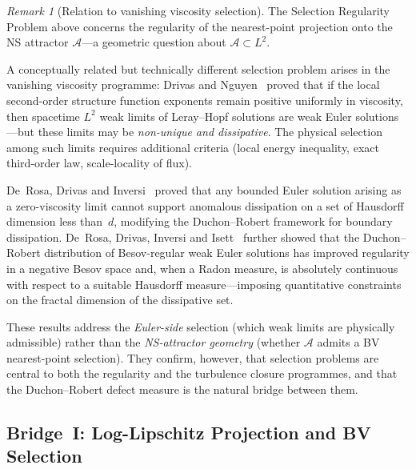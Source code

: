 \documentclass[12pt,a4paper]{article}
\theoremstyle{definition}
\theoremstyle{plain}
\theoremstyle{remark}
\newtheorem{remark}[definition]{Remark}
\begin{document}
\begin{remark}[Relation to vanishing viscosity selection]
\label{rem:Drivas-VV-selection}
The Selection Regularity Problem above concerns the regularity of the
nearest-point projection onto the NS attractor $\mathcal{A}$---a geometric
question about $\mathcal{A} \subset L^2$.

A conceptually related but technically different selection problem arises
in the vanishing viscosity programme: Drivas and
Nguyen~\cite{DrivasNguyen2019} proved that if the local second-order
structure function exponents remain positive uniformly in viscosity, then
spacetime $L^2$ weak limits of Leray--Hopf solutions are weak Euler
solutions---but these limits may be \emph{non-unique and dissipative}.
The physical selection among such limits requires additional criteria
(local energy inequality, exact third-order law, scale-locality of flux).

De~Rosa, Drivas and Inversi~\cite{DeRosaDrivasInversi2024} proved that any
bounded Euler solution arising as a zero-viscosity limit cannot support
anomalous dissipation on a set of Hausdorff dimension less than~$d$,
modifying the Duchon--Robert framework for boundary dissipation.
De~Rosa, Drivas, Inversi and Isett~\cite{DeRosaDrivasInversiIsett2025}
further showed that the Duchon--Robert distribution of Besov-regular
weak Euler solutions has improved regularity in a negative Besov space
and, when a Radon measure, is absolutely continuous with respect to a
suitable Hausdorff measure---imposing quantitative constraints on the
fractal dimension of the dissipative set.

These results address the \emph{Euler-side} selection (which weak limits
are physically admissible) rather than the \emph{NS-attractor geometry}
(whether $\mathcal{A}$ admits a BV nearest-point selection). They
confirm, however, that selection problems are central to both the
regularity and the turbulence closure programmes, and that the
Duchon--Robert defect measure is the natural bridge between them.
\end{remark}


\subsection*{Bridge~I: Log-Lipschitz Projection and BV Selection}
\end{document}
